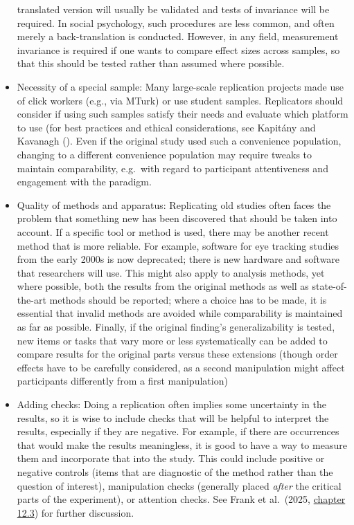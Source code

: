 \documentclass[
  letterpaper,
  DIV=11,
  openany,
  fontsize=12pt,
  parskip=half,
  headings=big,
  numbers=noenddot,
  titlepage=false]{scrreprt}
\begin{document}
\begin{itemize}
  translated version will usually be validated and tests of invariance
  will be required. In social psychology, such procedures are less
  common, and often merely a back-translation is conducted. However, in
  any field, measurement invariance is required if one wants to compare
  effect sizes across samples, so that this should be tested rather than
  assumed where possible.
\item
  {Necessity of a special sample:} Many large-scale replication projects
  made use of click workers (e.g., via MTurk) or use student samples.
  Replicators should consider if using such samples satisfy their needs
  and evaluate which platform to use (for best practices and ethical
  considerations, see Kapitány and Kavanagh
  (). Even if the original
  study used such a convenience population, changing to a different
  convenience population may require tweaks to maintain comparability,
  e.g.~with regard to participant attentiveness and engagement with the
  paradigm.
\item
  {Quality of methods and apparatus:} Replicating old studies often
  faces the problem that something new has been discovered that should
  be taken into account. If a specific tool or method is used, there may
  be another recent method that is more reliable. For example, software
  for eye tracking studies from the early 2000s is now deprecated; there
  is new hardware and software that researchers will use. This might
  also apply to analysis methods, yet where possible, both the results
  from the original methods as well as state-of-the-art methods should
  be reported; where a choice has to be made, it is essential that
  invalid methods are avoided while comparability is maintained as far
  as possible. Finally, if the original finding's generalizability is
  tested, new items or tasks that vary more or less systematically can
  be added to compare results for the original parts versus these
  extensions (though order effects have to be carefully considered, as a
  second manipulation might affect participants differently from a first
  manipulation)
\item
  {Adding checks:} Doing a replication often implies some uncertainty in
  the results, so it is wise to include checks that will be helpful to
  interpret the results, especially if they are negative. For example,
  if there are occurrences that would make the results meaningless, it
  is good to have a way to measure them and incorporate that into the
  study. This could include positive or negative controls (items that
  are diagnostic of the method rather than the question of interest),
  manipulation checks (generally placed \emph{after }the critical parts
  of the experiment), or attention checks. See Frank et al.~(2025,
  \href{https://experimentology.io/012-collection.html\#ensuring-high-quality-data}{chapter
  12.3}) for further discussion.
\end{itemize}
\end{document}
